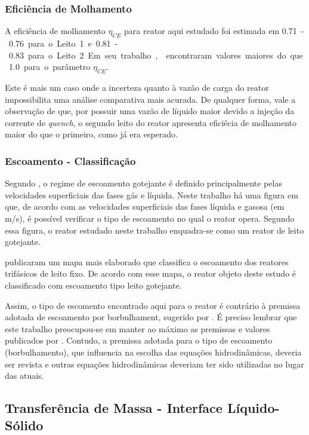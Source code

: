 \subsubsection{Eficiência de Molhamento} \label{eficienciademolhamento}

A eficiência de molhamento $\eta_{CE}$ para reator aqui estudado foi estimada em
\SI{0,71}-\SI{0,76} para o Leito 1 e \SI{0,81}-\SI{0,83} para o Leito 2. Em seu
trabalho,  encontraram valores maiores do que \SI{1,0}
para o parâmetro $\eta_{CE}$.

Este é mais um caso onde a incerteza quanto à vazão de carga do reator
impossibilita uma análise comparativa mais acurada. De qualquer forma, vale a
observação de que, por possuir uma vazão de líquido maior devido a injeção da
corrente de \emph{quench}, o segundo leito do reator apresenta eficiêcia de
molhamento maior do que o primeiro, como já era esperado.

\subsubsection{Escoamento - Classificação} \label{escoamentoclassificacao}

Segundo , o regime de escoamento gotejante é definido
principalmente pelas velocidades superficiais das fases gás e líquida. Neste
trabalho há uma figura em que, de acordo com as velocidades superficiais das
fases líquida e gasosa (em \si{m/s}), é possível verificar o tipo de escoamento
no qual o reator opera. Segundo essa figura, o reator estudado neste trabalho
enquadra-se como um reator de leito gotejante.

 publicaram um mapa mais elaborado que classifica o
escoamento dos reatores trifásicos de leito fixo. De acordo com esse mapa, o
reator objeto deste estudo é classificado com escoamento tipo leito
gotejante.

Assim, o tipo de escomento encontrado aqui para o reator é contrário à premissa
adotada de escoamento por borbulhament, sugerido por . É
preciso lembrar que este trabalho preocupou-se em manter ao máximo as premissas
e valores publicados por . Contudo, a premissa adotada
para o tipo de escoamento (borbulhamento), que influencia na escolha das
equações hidrodinâmicas, deveria ser revista e outras equações hidrodinâmicas
deveriam ter sido utilizadas no lugar das atuais.

\subsection{Transferência de Massa - Interface Líquido-Sólido}
\label{transferênciademassainterfaceliquidosolido}

